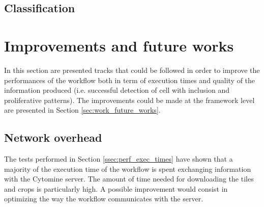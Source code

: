 \begin{figure}
{	}
	\caption{}
	\label{fig:failing_detection}
\end{figure}

\subsection{Classification}

\section{Improvements and future works}

In this section are presented tracks that could be followed in order to improve the performances of the workflow both in term of execution times and quality of the information produced (i.e. successful detection of cell with inclusion and proliferative patterns). The improvements could be made at the framework level are presented in Section \ref{sec:work_future_works}.

\subsection{Network overhead}
The tests performed in Section \ref{ssec:perf_exec_times} have shown that a majority of the execution time of the workflow is spent exchanging information with the Cytomine server. The amount of time needed for downloading the tiles and crops is particularly high. A possible improvement would consist in optimizing the way the workflow communicates with the server. 

